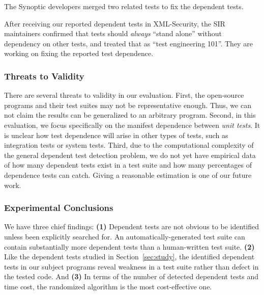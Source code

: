 The Synoptic developers merged two related tests to fix
the dependent tests.

After receiving our reported dependent tests in XML-Security,
the SIR~\cite{sir} maintainers 
confirmed that tests should \textit{always} ``stand alone''
without dependency on other tests, and treated that as
``test engineering 101''. They are working on fixing the reported
test dependence.

\subsubsection{Threats to Validity}

There are several threats to validity in our evaluation.
First, the \subjnum open-source
programs and their test suites may not be
representative enough. Thus, we can not claim the results
can be generalized to an arbitrary program.
Second, in this evaluation, we focus specifically on
the {manifest dependence} between \textit{unit tests}.
It is unclear how test dependence will arise
in other types of tests, such as integration tests
or system tests.
Third, due to the computational complexity of the general dependent test
detection problem, we do not yet have
empirical data of how many dependent
tests exist in a test suite and how many percentages of dependence tests
\ourtool can catch.  Giving a reasonable estimation is one of our future work.


\subsubsection{Experimental Conclusions}


We have three chief findings: \textbf{(1)}
Dependent tests are not obvious to be identified
unless been explicitly searched for.
An automatically-generated test suite can contain
substantially more dependent tests than a human-written
test suite.
\textbf{(2)} Like the dependent tests
studied in Section~\ref{sec:study}, the identified
dependent tests in our subject programs reveal weakness
in a test suite rather than defect in the tested code.
And \textbf{(3)} In terms
of the number of detected dependent tests
and time cost, the randomized algorithm is the
most cost-effective one.

